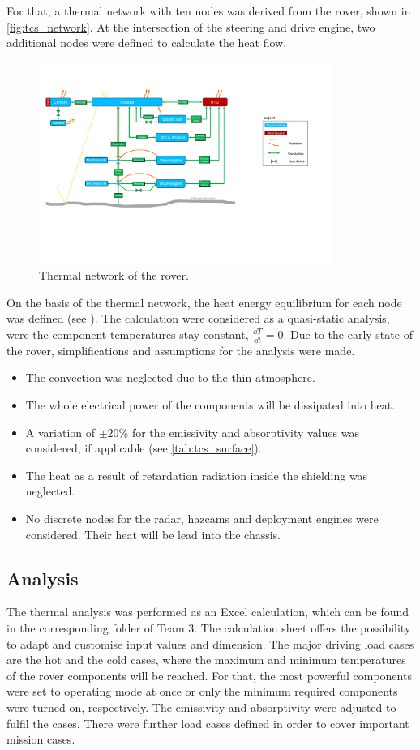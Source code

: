 For that, a thermal network with ten nodes was derived from the rover, shown in \autoref{fig:tcs_network}.
At the intersection of the steering and drive engine, two additional nodes were defined to calculate the heat flow.

\begin{figure}[H]
	\centering
	\includegraphics[width=0.85\textwidth]{Media/tcs_network}
	\caption{Thermal network of the rover.}
	\label{fig:tcs_network}
\end{figure}

On the basis of the thermal network, the heat energy equilibrium for each node was defined (see ).
The calculation were considered as a quasi-static analysis, were the component temperatures stay constant, $\frac{\dd T}{\dd t}=0$.
Due to the early state of the rover, simplifications and assumptions for the analysis were made.
\begin{itemize}
	\item The convection was neglected due to the thin atmosphere.
	\item The whole electrical power of the components will be dissipated into heat.
	\item A variation of $\pm 20\%$ for the emissivity and absorptivity values was considered, if applicable (see \autoref{tab:tcs_surface}).
	\item The heat as a result of retardation radiation inside the shielding was neglected.
	\item No discrete nodes for the radar, hazcams and deployment engines were considered. Their heat will be lead into the chassis.
\end{itemize}


\subsection{Analysis}
The thermal analysis was performed as an Excel calculation, which can be found in the corresponding folder of Team 3.
The calculation sheet offers the possibility to adapt and customise input values and dimension.
The major driving load cases are the  hot and the cold cases, where the maximum and minimum temperatures of the rover components will be reached.
For that, the most powerful components were set to operating mode at once or only the minimum required components were turned on, respectively.
The emissivity and absorptivity were adjusted to fulfil the cases.
There were further load cases defined in order to cover important mission cases.

